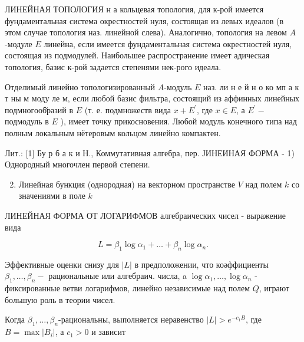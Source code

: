 \documentclass[10pt]{article}
\begin{document}
ЛИНЕЙНАЯ ТОПОЛОГИЯ н а кольцевая топология, для к-рой имеется фундаментальная система окрестностей нуля, состоящая из левых идеалов (в этом случае топология наз. линейной слева). Аналогично, топология на левом $A$-модуле $E$ линейна, если имеется фундаментальная система окрестностей нуля, состоящая из подмодулей. Наибольшее распространение имеет адическая топология, базис к-рой задается степенями нек-рого идеала.



Отделимый линейно топологизированный $A$-модуль $E$ наз. ли н е й н о ко мп а к т ны м моду ле м, если любой базис фильтра, состоящий из аффинных линейных подмногооб̆разий в $E$ (т. е. подмножеств вида $x+E^{\prime}$, где $x \in E$, а $E^{\prime}-$ подмодуль в $E$ ), имеет точку прикосновения. Любой модуль конечного типа над полным локальным нётеровым кольцом линейно компактен.



Лит.: [1] Бу р б а к и Н., Коммутативная алгебра, пер. ЈИНЕИНАЯ ФОРМА - 1) Однородный многочлен первой степени.



\begin{enumerate}

  \setcounter{enumi}{1}

  \item Линейная бункция (однородная) на векторном пространстве $V$ над полем $k$ со значениями в поле $k$

\end{enumerate}



ЛИНЕЙНАЯ ФОРМА ОТ ЛОГАРИФМОВ алгебраических чисел - выражение вида



\[

L=\beta_{1} \log \alpha_{1}+\ldots+\beta_{n} \log \alpha_{n} .

\]



Эффективные оценки снизу для $|L|$ в предположении, что коәффициенты $\beta_{1}, \ldots, \beta_{n}-$ рациональные или алгебраич. числа, a $\log \alpha_{1}, \ldots, \log \alpha_{n}$ - фиксированные ветви логарифмов, линейно независимые над полем $Q$, играют большую роль в теории чисел.



Когда $\beta_{1}, \ldots, \beta_{n}$-рациональны, выполняется неравенство $|L|>e^{-c_{1} B}$, где $B=\max \left|B_{i}\right|$, а $c_{1}>0$ и зависит
\end{document}
